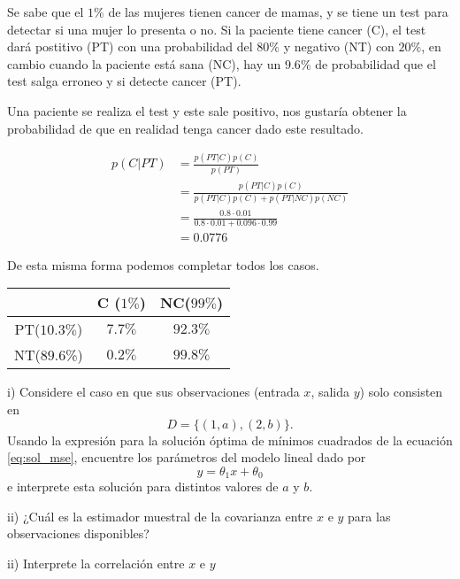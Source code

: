 Se sabe que el $1\%$ de las mujeres tienen cancer de mamas, y se tiene un test para detectar si una mujer lo presenta o no. Si la paciente tiene cancer (C), el test dará postitivo (PT) con una probabilidad del $80\%$ y negativo (NT) con $20\%$, en cambio cuando la paciente está sana (NC), hay un $9.6\%$ de probabilidad que el test salga erroneo y si detecte cancer (PT).

Una paciente se realiza el test y este sale positivo, nos gustaría obtener la probabilidad de que en realidad tenga cancer dado este resultado.

\begin{align}
	p(C|PT) & =\frac{p(PT|C)p(C)}{p(PT)} \\
			& = \frac{p(PT|C)p(C)}{p(PT|C)p(C)+p(PT|NC)p(NC)} \\
			& = \frac{0.8 \cdot 0.01}{0.8 \cdot 0.01 + 0.096 \cdot 0.99}\\
			& = 0.0776
\end{align}

De esta misma forma podemos completar todos los casos.
\\
{
\centering
\begin{tabular}{c|cc}
\toprule
   & C ($1\%$) &  NC($99\%$) \\\hline
PT($10.3\%$) & $7.7\%$ & $92.3\%$\\
NT($89.6$\%) & $0.2\%$ & $99.8\%$ \\
\bottomrule
\end{tabular}
}




i) Considere el caso en que sus observaciones (entrada $x$, salida $y$) solo consisten en 
\begin{equation}
D = \{(1,a),(2,b)\}.
\end{equation}
Usando la expresión para la solución óptima de mínimos cuadrados de la ecuación \eqref{eq:sol_mse}, encuentre los parámetros del modelo lineal dado por 
\begin{equation}
	y = \theta_1 x +\theta_0 
\end{equation}
e interprete esta solución para distintos valores de $a$ y $b$.

ii) ¿Cuál es la estimador muestral de la covarianza entre $x$ e $y$ para las observaciones disponibles? 

ii) Interprete la correlación entre $x$ e $y$ 




